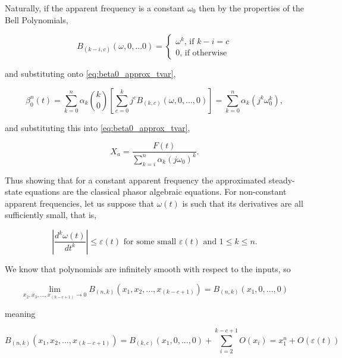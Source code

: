	Naturally, if the apparent frequency is a constant $\omega_0$ then by the properties of the Bell Polynomials,

\begin{equation} B_{\left(k-i,c\right)}\left(\omega,0,...0\right) = \left\{\begin{array}{l} \omega^{k} \text{, if } k-i=c \\[2mm] 0 \text{, if otherwise} \end{array}\right. \end{equation}

	\noindent and substituting onto \eqref{eq:beta0_approx_tvar},

\begin{equation} \beta_0^n(t) = \sum\limits_{k=0}^{n} \alpha_k{k\choose 0} \left[\sum\limits_{c=0}^{k} j^cB_{\left(k,c\right)}\left(\omega,0,...,0\right)\right] = \sum\limits_{k=0}^{n} \alpha_k \left(j^k\omega_0^k\right),  \end{equation}

	\noindent and substituting this into \eqref{eq:beta0_approx_tvar},

\begin{equation} X_a = \dfrac{F(t)}{\displaystyle \sum\limits_{k=i}^{n} \alpha_k \left( j\omega_0\right)^k} .\end{equation}

	Thus showing that for a constant apparent frequency the approximated steady-state equations are the classical phasor algebraic equations. For non-constant apparent frequencies, let us suppose that $\omega(t)$ is such that its derivatives are all sufficiently small, that is,

\begin{equation} \left\lvert\dfrac{d^k\omega(t)}{dt^k}\right\rvert \leq \varepsilon(t) \text{ for some small } \varepsilon(t) \text{ and } 1\leq k \leq n. \end{equation}

	We know that polynomials are infinitely smooth with respect to the inputs, so

\begin{equation} \lim_{x_2,x_3,...,x_{\left(k-c+1\right)}\to 0} B_{\left(n,k\right)}\left(x_1,x_2,...,x_{\left(k-c+1\right)}\right) = B_{\left(n,k\right)}\left(x_1,0,...,0\right)\end{equation}

	\noindent meaning

\begin{equation} B_{\left(n,k\right)}\left(x_1,x_2,...,x_{\left(k-c+1\right)}\right) = B_{\left(k,c\right)}\left(x_1,0,...,0\right) + \sum_{i=2}^{k-c+1} O\left(x_i\right) = x_1^n + O\left(\varepsilon(t)\right)\end{equation}

